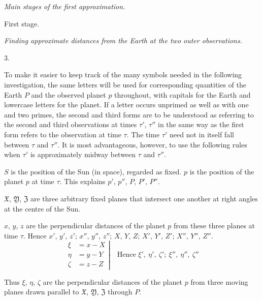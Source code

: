 \begin{center}
\emph{Main stages of the first approximation.}\par\medskip
First stage.\par\smallskip
\emph{Finding approximate distances from the Earth at the two outer observations.}
\end{center}
\begin{center}3.\end{center}
To make it easier to keep track of the many symbols needed in the following investigation, the same letters will be used for corresponding quantities of the Earth $P$ and the observed planet $p$ throughout, with capitals for the Earth and lowercase letters for the planet. If a letter occurs unprimed as well as with one and two primes, the second and third forms are to be understood as referring to the second and third observations at times $\tau'$, $\tau''$ in the same way as the first form refers to the observation at time $\tau$. The time $\tau'$ need not in itself fall between $\tau$ and $\tau''$. It is most advantageous, however, to use the following rules when $\tau'$ is approximately midway between $\tau$ and $\tau''$.

$S$ is the position of the Sun (in space), regarded as fixed. $p$ is the position of the planet $p$ at time $\tau$. This explains $p'$, $p''$, $P$, $P'$, $P''$.

$\mathfrak{X}$, $\mathfrak{Y}$, $\mathfrak{Z}$ are three arbitrary fixed planes that intersect one another at right angles at the centre of the Sun.

$x$, $y$, $z$ are the perpendicular distances of the planet $p$ from these three planes at time $\tau$. Hence $x'$, $y'$, $z'$; $x''$, $y''$, $z''$; $X$, $Y$, $Z$; $X'$, $Y'$, $Z'$; $X''$, $Y''$, $Z''$.
\[
\left.\begin{aligned}
\xi&=x-X\\
\eta&=y-Y\\
\zeta&=z-Z
\end{aligned}\right|\quad\text{Hence }\xi',\ \eta',\ \zeta';\ \xi'',\ \eta'',\ \zeta''
\]

Thus $\xi$, $\eta$, $\zeta$ are the perpendicular distances of the planet $p$ from three moving planes drawn parallel to $\mathfrak{X}$, $\mathfrak{Y}$, $\mathfrak{Z}$ through $P$.

